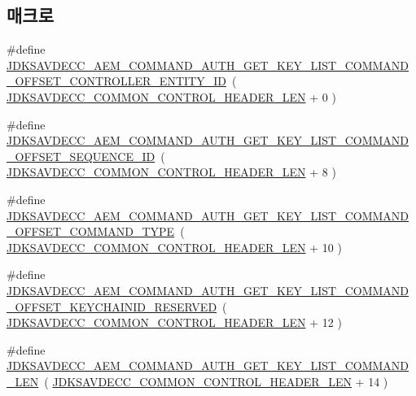 \subsection*{매크로}
\begin{DoxyCompactItemize}
\item 
\#define \hyperlink{group__command__auth__get__key__list_gad4af2254ad82f469a714bac04ac96804}{J\+D\+K\+S\+A\+V\+D\+E\+C\+C\+\_\+\+A\+E\+M\+\_\+\+C\+O\+M\+M\+A\+N\+D\+\_\+\+A\+U\+T\+H\+\_\+\+G\+E\+T\+\_\+\+K\+E\+Y\+\_\+\+L\+I\+S\+T\+\_\+\+C\+O\+M\+M\+A\+N\+D\+\_\+\+O\+F\+F\+S\+E\+T\+\_\+\+C\+O\+N\+T\+R\+O\+L\+L\+E\+R\+\_\+\+E\+N\+T\+I\+T\+Y\+\_\+\+ID}~( \hyperlink{group__jdksavdecc__avtp__common__control__header_gaae84052886fb1bb42f3bc5f85b741dff}{J\+D\+K\+S\+A\+V\+D\+E\+C\+C\+\_\+\+C\+O\+M\+M\+O\+N\+\_\+\+C\+O\+N\+T\+R\+O\+L\+\_\+\+H\+E\+A\+D\+E\+R\+\_\+\+L\+EN} + 0 )
\item 
\#define \hyperlink{group__command__auth__get__key__list_gafacd5e453c1f5c3b802eb18e0436248f}{J\+D\+K\+S\+A\+V\+D\+E\+C\+C\+\_\+\+A\+E\+M\+\_\+\+C\+O\+M\+M\+A\+N\+D\+\_\+\+A\+U\+T\+H\+\_\+\+G\+E\+T\+\_\+\+K\+E\+Y\+\_\+\+L\+I\+S\+T\+\_\+\+C\+O\+M\+M\+A\+N\+D\+\_\+\+O\+F\+F\+S\+E\+T\+\_\+\+S\+E\+Q\+U\+E\+N\+C\+E\+\_\+\+ID}~( \hyperlink{group__jdksavdecc__avtp__common__control__header_gaae84052886fb1bb42f3bc5f85b741dff}{J\+D\+K\+S\+A\+V\+D\+E\+C\+C\+\_\+\+C\+O\+M\+M\+O\+N\+\_\+\+C\+O\+N\+T\+R\+O\+L\+\_\+\+H\+E\+A\+D\+E\+R\+\_\+\+L\+EN} + 8 )
\item 
\#define \hyperlink{group__command__auth__get__key__list_ga2ffcdfb13861c5dd6c05fa3518c9969d}{J\+D\+K\+S\+A\+V\+D\+E\+C\+C\+\_\+\+A\+E\+M\+\_\+\+C\+O\+M\+M\+A\+N\+D\+\_\+\+A\+U\+T\+H\+\_\+\+G\+E\+T\+\_\+\+K\+E\+Y\+\_\+\+L\+I\+S\+T\+\_\+\+C\+O\+M\+M\+A\+N\+D\+\_\+\+O\+F\+F\+S\+E\+T\+\_\+\+C\+O\+M\+M\+A\+N\+D\+\_\+\+T\+Y\+PE}~( \hyperlink{group__jdksavdecc__avtp__common__control__header_gaae84052886fb1bb42f3bc5f85b741dff}{J\+D\+K\+S\+A\+V\+D\+E\+C\+C\+\_\+\+C\+O\+M\+M\+O\+N\+\_\+\+C\+O\+N\+T\+R\+O\+L\+\_\+\+H\+E\+A\+D\+E\+R\+\_\+\+L\+EN} + 10 )
\item 
\#define \hyperlink{group__command__auth__get__key__list_gaa5dcee5fe39233ce6e53f5225f908ada}{J\+D\+K\+S\+A\+V\+D\+E\+C\+C\+\_\+\+A\+E\+M\+\_\+\+C\+O\+M\+M\+A\+N\+D\+\_\+\+A\+U\+T\+H\+\_\+\+G\+E\+T\+\_\+\+K\+E\+Y\+\_\+\+L\+I\+S\+T\+\_\+\+C\+O\+M\+M\+A\+N\+D\+\_\+\+O\+F\+F\+S\+E\+T\+\_\+\+K\+E\+Y\+C\+H\+A\+I\+N\+I\+D\+\_\+\+R\+E\+S\+E\+R\+V\+ED}~( \hyperlink{group__jdksavdecc__avtp__common__control__header_gaae84052886fb1bb42f3bc5f85b741dff}{J\+D\+K\+S\+A\+V\+D\+E\+C\+C\+\_\+\+C\+O\+M\+M\+O\+N\+\_\+\+C\+O\+N\+T\+R\+O\+L\+\_\+\+H\+E\+A\+D\+E\+R\+\_\+\+L\+EN} + 12 )
\item 
\#define \hyperlink{group__command__auth__get__key__list_ga9a51067861389e660c4de9e2ac82a0e2}{J\+D\+K\+S\+A\+V\+D\+E\+C\+C\+\_\+\+A\+E\+M\+\_\+\+C\+O\+M\+M\+A\+N\+D\+\_\+\+A\+U\+T\+H\+\_\+\+G\+E\+T\+\_\+\+K\+E\+Y\+\_\+\+L\+I\+S\+T\+\_\+\+C\+O\+M\+M\+A\+N\+D\+\_\+\+L\+EN}~( \hyperlink{group__jdksavdecc__avtp__common__control__header_gaae84052886fb1bb42f3bc5f85b741dff}{J\+D\+K\+S\+A\+V\+D\+E\+C\+C\+\_\+\+C\+O\+M\+M\+O\+N\+\_\+\+C\+O\+N\+T\+R\+O\+L\+\_\+\+H\+E\+A\+D\+E\+R\+\_\+\+L\+EN} + 14 )
\end{DoxyCompactItemize}
